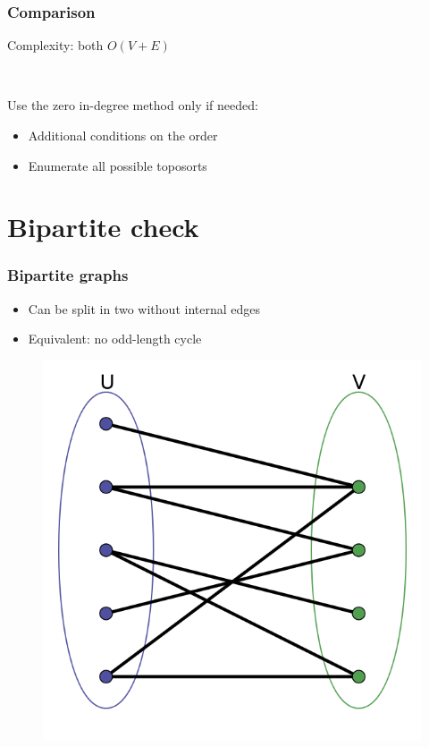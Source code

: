 \documentclass[12pt]{beamer}
\begin{document}
\begin{frame}
\frametitle{Comparison}
Complexity: both $O(V+E)$

~

Use the zero in-degree method only if needed:
\begin{itemize}
\item Additional conditions on the order
\item Enumerate all possible toposorts
\end{itemize}
\end{frame}

\section{Bipartite check}

\begin{frame}
\frametitle{Bipartite graphs}
\begin{itemize}
\item Can be split in two without internal edges
\item Equivalent: no odd-length cycle
\end{itemize}
\begin{figure}
\centering
\includegraphics[width=0.5\linewidth]{img/bipartite}
\end{figure}
\end{frame}
\end{document}
